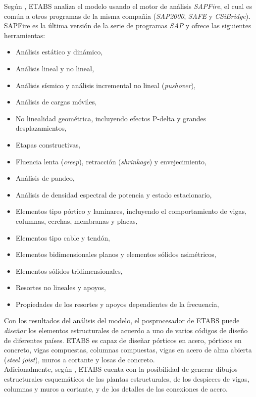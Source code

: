 Según \cite{ETABS2017analysisreferencemanual}, ETABS analiza el modelo usando el motor de análisis \emph{SAPFire}, el cual es común a otros programas de la misma compañia (\emph{SAP2000}, \emph{SAFE} y \emph{CSiBridge}). SAPFire es la última versión de la serie de programas \emph{SAP} y ofrece las siguientes herramientas:
\begin{itemize}
\item Análisis estático y dinámico,
\item Análisis lineal y no lineal,
\item Análisis sísmico y análisis incremental no lineal (\emph{pushover}),
\item Análisis de cargas móviles,
\item No linealidad geométrica, incluyendo efectos P-delta y grandes desplazamientos,
\item Etapas constructivas,
\item Fluencia lenta (\emph{creep}), retracción (\emph{shrinkage}) y envejecimiento,
\item Análisis de pandeo,
\item Análisis de densidad espectral de potencia y estado estacionario,
\item Elementos tipo pórtico y laminares, incluyendo el comportamiento de vigas, columnas, cerchas, membranas y placas,
\item Elementos tipo cable y tendón,
\item Elementos bidimensionales planos y elementos sólidos asimétricos,
\item Elementos sólidos tridimensionales,
\item Resortes no lineales y apoyos,
\item Propiedades de los resortes y apoyos dependientes de la frecuencia,
\end{itemize}

Con los resultados del análisis del modelo, el posprocesador de ETABS puede \emph{diseñar} los elementos estructurales de acuerdo a uno de varios códigos de diseño de diferentes países. ETABS es capaz de diseñar pórticos en acero, pórticos en concreto, vigas compuestas, columnas compuestas, vigas en acero de alma abierta (\emph{steel joist}), muros a cortante y losas de concreto.\\

Adicionalmente, según \cite{ETABS2019welcome}, ETABS cuenta con la posibilidad de generar dibujos estructurales esquemáticos de las plantas estructurales, de los despieces de vigas, columnas y muros a cortante, y de los detalles de las conexiones de acero.\\

